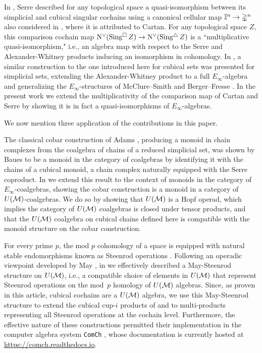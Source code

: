 In \cite[p. 442]{serre1951homologie}, Serre described for any topological space a quasi-isomorphism between its simplicial and cubical singular cochains using a canonical cellular map $\mathbb{I}^n \to \mathbb{\Delta}^n$ also considered in \cite[p.199]{eilenberg1953acyclic}, where it is attributed to Cartan.
For any topological space $Z$, this comparison cochain map $\operatorname{N^{\vee}}(\operatorname{Sing^{\square}} Z) \to \operatorname{N^{\vee}}(\operatorname{Sing^{\triangle}} Z)$ is a ``multiplicative quasi-isomorphism," i.e., an algebra map with respect to the Serre and Alexander-Whitney products inducing an isomorphism in cohomology.
In \cite{medina2020prop1}, a similar construction to the one introduced here for cubical sets was presented for simplicial sets, extending the Alexander-Whitney product to a full $E_\infty$-algebra and generalizing the $E_\infty$-structures of McClure--Smith \cite{mcclure2003multivariable} and Berger--Fresse \cite{berger2004combinatorial}.
In the present work we extend the multiplicativity of the comparison map of Cartan and Serre by showing it is in fact a quasi-isomorphisms of $E_\infty$-algebras.

We now mention three application of the contributions in this paper.

The classical cobar construction of Adams \cite{adams1956cobar}, producing a monoid in chain complexes from the coalgebra of chains of a reduced simplicial set, was shown by Baues \cite{baues1998hopf} to be a monoid in the category of coalgebras by identifying it with the chains of a cubical monoid, a chain complex naturally equipped with the Serre coproduct.
In \cite{medina2021cobar} we extend this result to the context of monoids in the category of $E_\infty$-coalgebras, showing the cobar construction is a monoid in a category of $U(\mathcal{M})$-coalgebras.
We do so by showing that $U(\mathcal{M})$ is a Hopf operad, which implies the category of $U(\mathcal{M})$ coalgebras is closed under tensor products, and that the $U(\mathcal{M})$ coalgebra on cubical chains defined here is compatible with the monoid structure on the cobar construction.

For every prime $p$, the mod $p$ cohomology of a space is equipped with natural stable endomorphisms known as Steenrod operations \cite{steenrod1962cohomology}.
Following an operadic viewpoint developed by May \cite{may1970general}, in \cite{medina2020maysteenrod} we effectively described a May-Steenrod structure on $U(\mathcal{M})$, i.e., a compatible choice of elements in $U(\mathcal{M})$ that represent Steenrod operations on the mod~$p$ homology of $U(\mathcal{M})$ algebras.
Since, as proven in this article, cubical cochains are a $U(\mathcal{M})$ algebra, we use this May-Steenrod structure to extend the cubical cup-$i$ products of \cite{kadeishvili2003cupi} and \cite{pilarczyk2016cubical} to multi-products representing all Steenrod operations at the cochain level.
Furthermore, the effective nature of these constructions permitted their implementation in the computer algebra system \texttt{ComCh} \cite{medina2021computer}, whose documentation is currently hosted at \url{https://comch.readthedocs.io}.

